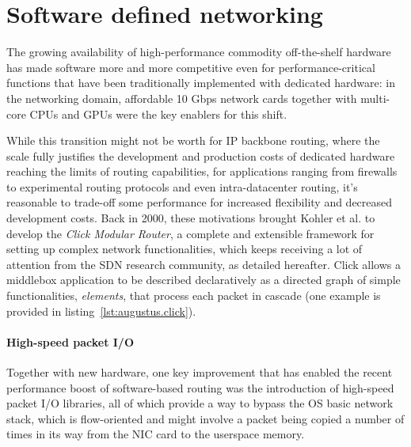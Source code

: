 \documentclass[11pt,a4paper,twoside,titlepage,openany]{book}
\begin{document}
\section{Software defined networking}
The growing availability of high-performance commodity off-the-shelf %
hardware has made software more and more competitive even for performance-critical functions that have been traditionally implemented with dedicated hardware: in the networking domain, affordable 10 Gbps network cards together with multi-core CPUs and GPUs were the key enablers for this shift.


While this transition might not be worth for IP backbone routing, where the scale fully justifies the development and production costs of dedicated hardware reaching the limits of routing capabilities, for applications ranging from firewalls to experimental routing protocols and even intra-datacenter routing, it's reasonable to trade-off some performance for increased flexibility and decreased development costs.
Back in 2000, these motivations brought Kohler et al. \cite{click} to develop the \emph{Click Modular Router}, a complete and extensible framework for setting up complex network functionalities, which keeps receiving a lot of attention from the \gls{SDN} research community, as detailed hereafter. Click allows a middlebox application to be described declaratively as a directed graph of simple functionalities, \emph{elements}, that process each packet in cascade (one example is provided in listing~\ref{lst:augustus.click}).

\paragraph{High-speed packet I/O} Together with new hardware, one key improvement that has enabled the recent performance boost of software-based routing was the introduction of high-speed packet I/O libraries, all of which provide a way to bypass the OS basic network stack, which is flow-oriented and might involve a packet being copied a number of times in its way from the NIC card to the userspace memory. %
\end{document}

